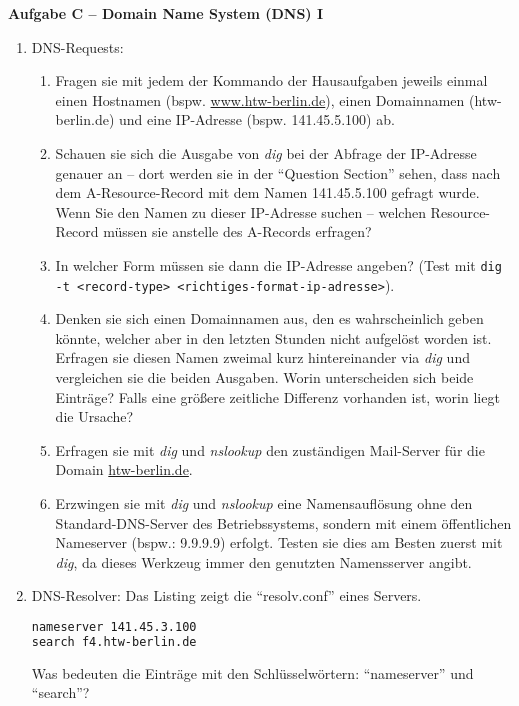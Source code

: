 \documentclass[paper=a4,fontsize=11pt]{scrartcl}%
\numberwithin{equation}{section}
\begin{document}
\begin{center}\Large{\textbf{Aufgabe C -- Domain Name System (DNS) I}}\end{center}\vskip0.25in
\begin{enumerate}
	\item DNS-Requests:
\begin{enumerate}[label=(\alph*)]
		\item Fragen sie mit jedem der Kommando der Hausaufgaben jeweils einmal einen Hostnamen (bspw. \url{www.htw-berlin.de}), einen Domainnamen (htw-berlin.de) und eine IP-Adresse (bspw. 141.45.5.100) ab.
		\item Schauen sie sich die Ausgabe von \emph{dig} bei der Abfrage der IP-Adresse genauer an -- dort werden sie in der \enquote{Question Section} sehen, dass nach dem A-Resource-Record mit dem Namen 141.45.5.100 gefragt wurde. Wenn Sie den Namen zu dieser IP-Adresse suchen -- welchen Resource-Record müssen sie anstelle des A-Records erfragen? 
		\item In welcher Form müssen sie dann die IP-Adresse angeben? (Test mit \texttt{dig -t <record-type> <richtiges-format-ip-adresse>}).
		\item Denken sie sich einen Domainnamen aus, den es wahrscheinlich geben könnte, welcher aber in den letzten Stunden nicht aufgelöst worden ist. Erfragen sie diesen Namen zweimal kurz hintereinander via \emph{dig} und vergleichen sie die beiden Ausgaben. Worin unterscheiden sich beide Einträge? Falls eine größere zeitliche Differenz vorhanden ist, worin liegt die Ursache?
		\item Erfragen sie mit \emph{dig} und \emph{nslookup} den zuständigen Mail-Server für die Domain \url{htw-berlin.de}.
		\item Erzwingen sie mit \emph{dig} und \emph{nslookup} eine Namensauflösung ohne den Standard-DNS-Server des Betriebssystems, sondern mit einem öffentlichen Nameserver (bspw.: 9.9.9.9) erfolgt. Testen sie dies am Besten zuerst mit \emph{dig}, da dieses Werkzeug immer den genutzten Namensserver angibt.
	\end{enumerate}
	\item DNS-Resolver: Das Listing zeigt die \enquote{resolv.conf} eines Servers. 
	\begin{lstlisting}[style=Bash, language=Bash]
nameserver 141.45.3.100
search f4.htw-berlin.de
\end{lstlisting} \label{dns}
Was bedeuten die Einträge mit den Schlüsselwörtern: \enquote{nameserver} und \enquote{search}?
\end{enumerate}
\end{document}
